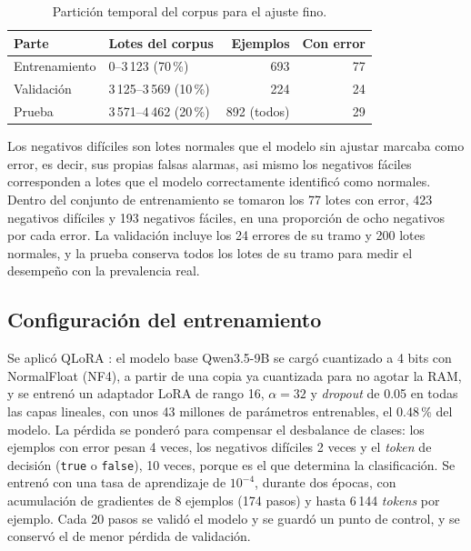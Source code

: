 \begin{table}[H]
\centering
\caption{Partición temporal del corpus para el ajuste fino.}
\label{tab:met_particion}
\small
\begin{tabular}{@{}llrr@{}}
\toprule
\textbf{Parte} & \textbf{Lotes del corpus} & \textbf{Ejemplos} & \textbf{Con error} \\
\midrule
Entrenamiento & 0--3\,123 (70\,\%) & 693 & 77 \\
Validación & 3\,125--3\,569 (10\,\%) & 224 & 24 \\
Prueba & 3\,571--4\,462 (20\,\%) & 892 (todos) & 29 \\
\bottomrule
\end{tabular}
\normalsize
\end{table}

Los negativos difíciles son lotes normales que el modelo sin ajustar marcaba como error, es decir, sus propias falsas alarmas, asi mismo los negativos fáciles corresponden a lotes que el modelo correctamente identificó como normales.
Dentro del conjunto de entrenamiento se tomaron los 77 lotes con error, 423 negativos difíciles y 193 negativos fáciles, en una proporción de ocho negativos por cada error. La validación incluye los 24 errores de su tramo y 200 lotes normales, y la prueba conserva todos los lotes de su tramo para medir el desempeño con la prevalencia real.

\subsection{Configuración del entrenamiento}

Se aplicó QLoRA \cite{dettmers2023_qlora}: el modelo base Qwen3.5-9B se cargó cuantizado a 4 bits con NormalFloat (NF4), a partir de una copia ya cuantizada para no agotar la RAM, y se entrenó un adaptador LoRA de rango 16, $\alpha = 32$ y \textit{dropout} de 0.05 en todas las capas lineales, con unos 43 millones de parámetros entrenables, el 0.48\,\% del modelo. La pérdida se ponderó para compensar el desbalance de clases: los ejemplos con error pesan 4 veces, los negativos difíciles 2 veces y el \textit{token} de decisión (\texttt{true} o \texttt{false}), 10 veces, porque es el que determina la clasificación. Se entrenó con una tasa de aprendizaje de $10^{-4}$, durante dos épocas, con acumulación de gradientes de 8 ejemplos (174 pasos) y hasta 6\,144 \textit{tokens} por ejemplo. Cada 20 pasos se validó el modelo y se guardó un punto de control, y se conservó el de menor pérdida de validación.

